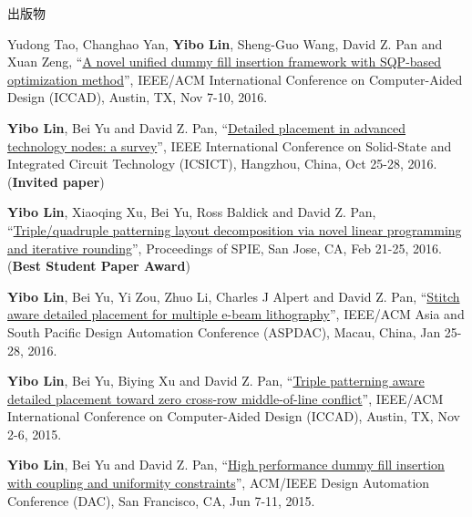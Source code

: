 \begin{rSection}{出版物}
\begin{description}[font=\normalfont]
{}
            

\item[{[C7]}]{
        Yudong Tao, Changhao Yan, \textbf{Yibo Lin}, Sheng-Guo Wang, David Z. Pan and Xuan Zeng, 
    ``\href{http://dx.doi.org/10.1145/2966986.2966994}{A novel unified dummy fill insertion framework with SQP-based optimization method}'', 
    IEEE/ACM International Conference on Computer-Aided Design (ICCAD), Austin, TX, Nov 7-10, 2016.
    
}
            

\item[{[C6]}]{
        \textbf{Yibo Lin}, Bei Yu and David Z. Pan, 
    ``\href{https://doi.org/10.1109/ICSICT.2016.7999056}{Detailed placement in advanced technology nodes: a survey}'', 
    IEEE International Conference on Solid-State and Integrated Circuit Technology (ICSICT), Hangzhou, China, Oct 25-28, 2016.
    (\textbf{Invited paper})
}
            

\item[{[C5]}]{
        \textbf{Yibo Lin}, Xiaoqing Xu, Bei Yu, Ross Baldick and David Z. Pan, 
    ``\href{http://dx.doi.org/10.1117/12.2218628}{Triple/quadruple patterning layout decomposition via novel linear programming and iterative rounding}'', 
    Proceedings of SPIE, San Jose, CA, Feb 21-25, 2016.
    (\textbf{Best Student Paper Award})
}
            

\item[{[C4]}]{
        \textbf{Yibo Lin}, Bei Yu, Yi Zou, Zhuo Li, Charles J Alpert and David Z. Pan, 
    ``\href{http://ieeexplore.ieee.org/xpl/articleDetails.jsp?arnumber=7428009}{Stitch aware detailed placement for multiple e-beam lithography}'', 
    IEEE/ACM Asia and South Pacific Design Automation Conference (ASPDAC), Macau, China, Jan 25-28, 2016.
    
}
            

\item[{[C3]}]{
        \textbf{Yibo Lin}, Bei Yu, Biying Xu and David Z. Pan, 
    ``\href{http://dl.acm.org/citation.cfm?id=2840875}{Triple patterning aware detailed placement toward zero cross-row middle-of-line conflict}'', 
    IEEE/ACM International Conference on Computer-Aided Design (ICCAD), Austin, TX, Nov 2-6, 2015.
    
}
            

\item[{[C2]}]{
        \textbf{Yibo Lin}, Bei Yu and David Z. Pan, 
    ``\href{http://dl.acm.org/citation.cfm?id=2744769.2744850}{High performance dummy fill insertion with coupling and uniformity constraints}'', 
    ACM/IEEE Design Automation Conference (DAC), San Francisco, CA, Jun 7-11, 2015.
    
}
\end{description}
\end{rSection}

